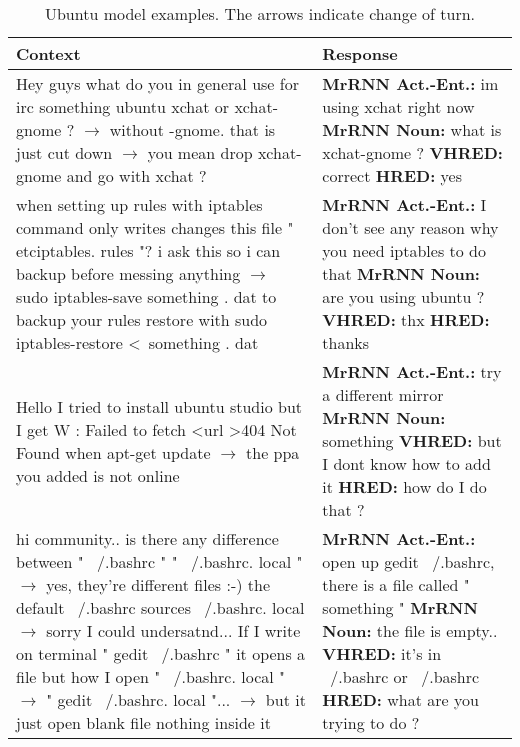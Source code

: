 \documentclass{article}
\begin{document}
\begin{table}[ht]
 \caption{Ubuntu model examples. The arrows indicate change of turn.}
 \label{table:ubuntu-examples-small}
 \scriptsize
 \centering
 \begin{tabular}{p{75mm}|p{50mm}}
 \textbf{Context} & \textbf{Response} \\ \hline
         Hey guys what do you in general use for irc something ubuntu xchat or xchat-gnome ? $\rightarrow$ without -gnome. that is just cut down $\rightarrow$ you mean drop xchat-gnome and go with xchat ? & \textbf{MrRNN Act.\@ -Ent.\@:} im using xchat right now \newline \textbf{MrRNN Noun:} what is xchat-gnome ? \newline \textbf{VHRED:} correct \newline \textbf{HRED:} yes \\ \hline 
        when setting up rules with iptables command only writes changes this file " \/etc\/iptables. rules "? i ask this so i can backup before messing anything $\rightarrow$ sudo iptables-save something . dat to backup your rules restore with sudo iptables-restore \textless \ something . dat & \textbf{MrRNN Act.\@ -Ent.\@:} I don't see any reason why you need iptables to do that \newline \textbf{MrRNN Noun:} are you using ubuntu ? \newline \textbf{VHRED:} thx \newline \textbf{HRED:} thanks \\ \hline 
        Hello I tried to install ubuntu studio but I get W : Failed to fetch \textless url \textgreater 404 Not Found when apt-get update $\rightarrow$ the ppa you added is not online & \textbf{MrRNN Act.\@ -Ent.\@:} try a different mirror \newline \textbf{MrRNN Noun:} something \newline \textbf{VHRED:} but I dont know how to add it \newline \textbf{HRED:} how do I do that ? \\ \hline 
        hi community.. is there any difference between " ~/.bashrc " " ~/.bashrc. local " $\rightarrow$ yes, they're different files :-) the default ~/.bashrc sources ~/.bashrc. local $\rightarrow$ sorry I could undersatnd... If I write on terminal " gedit ~/.bashrc " it opens a file but how I open " ~/.bashrc. local " $\rightarrow$ " gedit ~/.bashrc. local "... $\rightarrow$ but it just open blank file nothing inside it & \textbf{MrRNN Act.\@ -Ent.\@:} open up gedit ~/.bashrc, there is a file called " something " \newline \textbf{MrRNN Noun:} the file is empty.. \newline \textbf{VHRED:} it's in ~/.bashrc or ~/.bashrc  \newline \textbf{HRED:} what are you trying to do ? \\
 \bottomrule
 \end{tabular}
\end{table}
\end{document}
